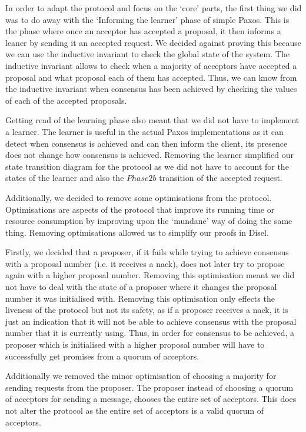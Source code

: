 In order to adapt the protocol and focus on the `core' parts, the first thing
we did was to do away with the `Informing the learner' phase of simple Paxos.
This is the phase where once an acceptor has accepted a proposal, it then informs
a leaner by sending it an accepted request. We decided against proving this
because we can use the inductive invariant to check the global state of the system.
The inductive invariant allows to check when a majority of acceptors have
accepted a proposal and what proposal each of them has accepted. Thus, we can know
from the inductive invariant when consensus has been achieved by checking the values
of each of the accepted proposals.

Getting read of the learning phase also meant that we did not have to implement
a learner.
The learner is useful in the actual Paxos implementations as
it can detect when consensus is achieved and can then inform the client, its
presence does not change how consensus is achieved. Removing the learner simplified
our state transition diagram for the protocol as we did not have to account
for the states of the learner and also the $Phase 2b$ transition of the
accepted request.

Additionally, we decided to remove some optimisations from the protocol.
Optimisations are aspects of the protocol that improve its running time or
resource consumption by improving upon the `mundane' way of doing the same
thing. Removing optimisations allowed us to simplify our proofs in Disel.

Firstly, we decided that a proposer, if it fails while trying to achieve
consensus with a proposal number (i.e. it receives a nack), does not later try
to propose again with a higher proposal number. Removing this optimisation meant we did not
have to deal with the state of a proposer where it changes the proposal number it
was initialised with. Removing this optimisation only
effects the liveness of the protocol but not its safety, as if a proposer
receives a nack, it is just an indication that it will not be able to achieve
consensus with the proposal number that it is currently using. Thus, in order
for consensus to be achieved, a proposer which is initialised with a higher
proposal number will have to successfully get promises from a quorum of acceptors.

Additionally we removed the minor optimisation of choosing a majority for
sending requests from the proposer. The proposer instead of choosing a
quorum of acceptors for sending a message, chooses the entire set of acceptors.
This does not alter the protocol as the entire set of acceptors is a valid
quorum of acceptors.

